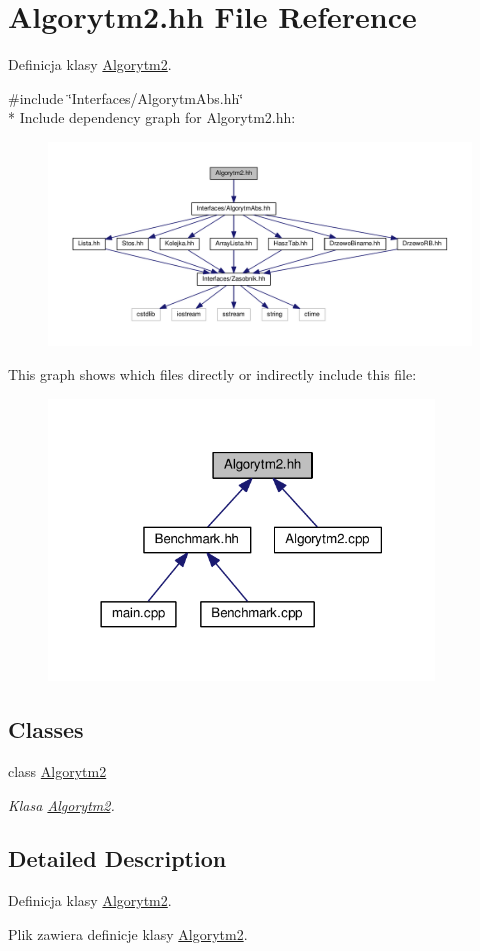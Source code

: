 \hypertarget{a00023}{}\section{Algorytm2.\+hh File Reference}
\label{a00023}


Definicja klasy \hyperlink{a00003}{Algorytm2}.  


{\ttfamily \#include \char`\"{}Interfaces/\+Algorytm\+Abs.\+hh\char`\"{}}\\*
Include dependency graph for Algorytm2.\+hh\+:
\nopagebreak
\begin{figure}[H]
\begin{center}
\leavevmode
\includegraphics[width=350pt]{a00064}
\end{center}
\end{figure}
This graph shows which files directly or indirectly include this file\+:
\nopagebreak
\begin{figure}[H]
\begin{center}
\leavevmode
\includegraphics[width=290pt]{a00065}
\end{center}
\end{figure}
\subsection*{Classes}
\begin{DoxyCompactItemize}
\item 
class \hyperlink{a00003}{Algorytm2}
\begin{DoxyCompactList}\small\item\em Klasa \hyperlink{a00003}{Algorytm2}. \end{DoxyCompactList}\end{DoxyCompactItemize}


\subsection{Detailed Description}
Definicja klasy \hyperlink{a00003}{Algorytm2}. 

Plik zawiera definicje klasy \hyperlink{a00003}{Algorytm2}. 